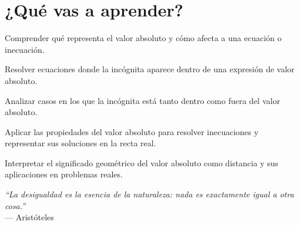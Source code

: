 \section*{¿Qué vas a aprender?}
\begin{aprende}
  \item Comprender qué representa el valor absoluto y cómo afecta a una ecuación o inecuación.  
  \item Resolver ecuaciones donde la incógnita aparece dentro de una expresión de valor absoluto.  
  \item Analizar casos en los que la incógnita está tanto dentro como fuera del valor absoluto.  
  \item Aplicar las propiedades del valor absoluto para resolver inecuaciones y representar sus soluciones en la recta real.  
  \item Interpretar el significado geométrico del valor absoluto como distancia y sus aplicaciones en problemas reales.  
\end{aprende}

\vspace{1cm}
\begin{flushright}
  {\oneptup\itshape ``La desigualdad es la esencia de la naturaleza: nada es exactamente igual a otra cosa.''}\\
  {\oneptup — Aristóteles}
\end{flushright}

